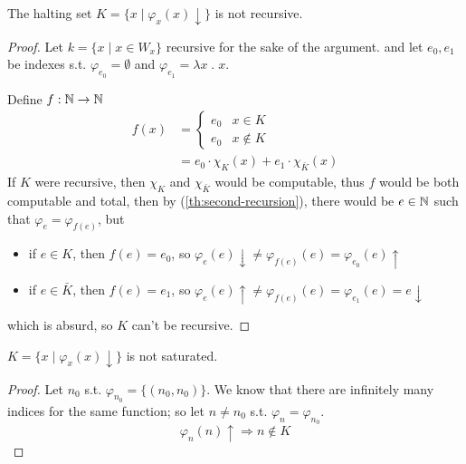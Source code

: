 \begin{corollary}
  The halting set $K = \{ x \mid \varphi_x(x)\downarrow\}$ is not recursive.
  \begin{proof}
    Let $k = \{ x \mid x \in W_x\}$ recursive for the sake of the
    argument. and let $e_0, e_1$ be indexes s.t.
    $\varphi_{e_0} = \emptyset$ and
    $\varphi_{e_1} = \lambda x \; . \; x$. 
    
    Define $f: \mathbb{N} \to \mathbb{N}$
    \begin{align*}
      f(x) &= \begin{cases}
        e_0 & x \in K \\
        e_0 & x \notin K
      \end{cases}\\
      &= e_0 \cdot \chi_K(x) + e_1 \cdot \chi_{\bar{K}}(x)
    \end{align*}
    If $K$ were recursive, then $\chi_K$ and $\chi_{\bar{K}}$ would be computable, thus
    $f$ would be both computable and total, then by
    (\ref{th:second-recursion}), there would be
    $e\in\mathbb{N}$ such that $\varphi_e = \varphi_{f(e)}$, but
    \begin{itemize}
      \item if $e\in K$, then $f(e)=e_0$, so $\varphi_e(e)\downarrow \neq \varphi_{f(e)}(e) = \varphi_{e_0}(e)\uparrow $
      \item if $e\in \bar{K}$, then $f(e)=e_1$, so $\varphi_e(e)\uparrow \neq \varphi_{f(e)}(e) = \varphi_{e_1}(e)=e\downarrow  $
    \end{itemize}
    which is absurd, so $K$ can't be recursive.
  \end{proof}
\end{corollary}

\begin{corollary}
  $K = \{ x \mid \varphi_x(x)\downarrow\}$ is not saturated.
  \begin{proof}
    Let $n_0$ s.t. $\varphi_{n_0} = \{(n_0, n_0)\}$. We know that
    there are infinitely many indices for the same function; so let
    $n \neq n_0$ s.t. $\varphi_n = \varphi_{n_0}$.
    \[
      \varphi_n(n) \uparrow \Rightarrow n \notin K
    \]
  \end{proof}
\end{corollary}
